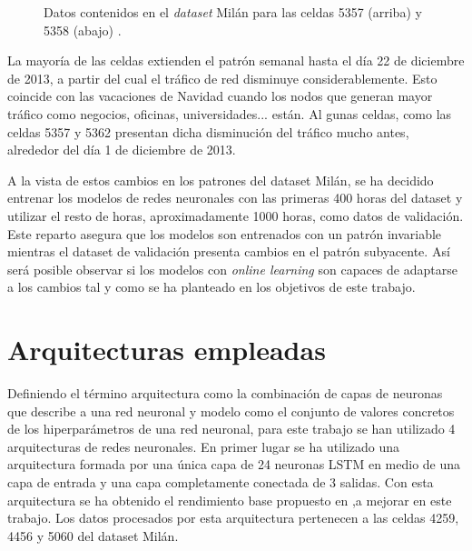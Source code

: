 \begin{figure}[h!]
	\centering
	\begin{subfigure}{\linewidth}
		
	\end{subfigure}
	\begin{subfigure}{\linewidth}
		
	\end{subfigure}
	\caption{Datos contenidos en el \textit{dataset} Milán para las celdas 5357 (arriba) y 5358 (abajo) \cite{milandataset}.}
	\label{5357_5358_raw}
\end{figure}
\FloatBarrier



La mayoría de las celdas extienden el patrón semanal hasta el día 22 de diciembre de 2013, a partir del cual el tráfico de red disminuye considerablemente. Esto coincide con las vacaciones de Navidad cuando los nodos que generan mayor tráfico como negocios, oficinas, universidades... están. Al gunas celdas, como las celdas 5357 y 5362 presentan dicha disminución del tráfico mucho antes, alrededor del día 1 de diciembre de 2013.

A la vista de estos cambios en los patrones del dataset Milán, se ha decidido entrenar los modelos de redes neuronales con las primeras 400 horas del dataset y utilizar el resto de horas, aproximadamente 1000 horas, como datos de validación. Este reparto asegura que los modelos son entrenados con un patrón invariable mientras el dataset de validación presenta cambios en el patrón subyacente. Así será posible observar si los modelos con \textit{online learning} son capaces de adaptarse a los cambios tal y como se ha planteado en los objetivos de este trabajo.




\section{Arquitecturas empleadas}
Definiendo el término arquitectura como la combinación de capas de neuronas que describe a una red neuronal y modelo como el conjunto de valores concretos de los hiperparámetros de una red neuronal, para este trabajo se han utilizado 4 arquitecturas de redes neuronales. En primer lugar se ha utilizado una arquitectura formada por una única capa de 24 neuronas LSTM en medio de una capa de entrada y una capa completamente conectada de 3 salidas. Con esta arquitectura se ha obtenido el rendimiento base propuesto en \cite{SKIMAcasaseca},a mejorar en este trabajo. Los datos procesados por esta arquitectura pertenecen a las celdas 4259, 4456 y 5060 del dataset Milán.

